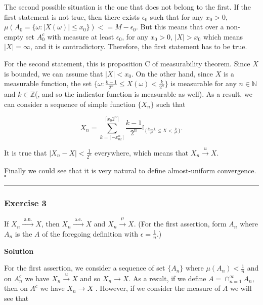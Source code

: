 \documentclass[
]{article}
\begin{document}
The second possible situation is the one that does not belong to the
first. If the first statement is not true, then there exists
\(\epsilon_0\) such that for any \(x_0 > 0\),
\(\mu(A_0 = \{\omega: |X(\omega)| \le x_0\}) <= M - \epsilon_0\). But
this means that over a non-empty set \(A_0^c\) with measure at least
\(\epsilon_0\), for any \(x_0 > 0\), \(|X| > x_0\) which means
\(|X| = \infty\), and it is contradictory. Therefore, the first
statement has to be true.

For the second statement, this is proposition
C\textquotesingle\textquotesingle{} of measurability theorem. Since
\(X\) is bounded, we can assume that \(|X| < x_0\). On the other hand,
since \(X\) is a measurable function, the set
\(\{\omega:  \frac{k-1}{2^n} \le X(\omega) < \frac{k}{2^n}\}\) is
measurable for any \(n\in \mathbb N\) and \(k \in \mathbb Z\)(, and so
the indicator function is measurable as well). As a result, we can
consider a sequence of simple function \(\{X_n\}\) such that

\[X_n = \sum_{k = \lceil -x_02^n\rceil }^{\lceil x_0 2^n \rceil } \frac{k-1}{2^n} \mathbb I_{\{\frac{k-1}{2^n} \le X < \frac{k}{2^n}\}}.\]

It is true that \(|X_n - X| < \frac{1}{2^n}\) everywhere, which means
that \(X_n \xrightarrow{u} X\).

Finally we could see that it is very natural to define almost-uniform
convergence. \(\square\)

\begin{center}\rule{0.5\linewidth}{0.5pt}\end{center}

\hypertarget{exercise-3-2}{%
  \subsubsection{Exercise 3}\label{exercise-3-2}}

If \(X_n \stackrel{\text { a.u. }}{\longrightarrow} X\), then
\(X_n \stackrel{\text { a.e. }}{\longrightarrow} X\) and
\(X_n \stackrel{\mu}{\longrightarrow} X\). (For the first assertion,
form \(A_n\) where \(A_n\) is the \(A\) of the foregoing definition with
\(\epsilon=\frac{1}{n}\).)

\textbf{Solution}

For the first assertion, we consider a sequence of set \(\{A_n\}\) where
\(\mu(A_n) < \frac{1}{n}\) and on \(A_n^c\) we have
\(X_n\xrightarrow{u} X\) and so \(X_n \to X\). As a result, if we define
\(A = \cap_{n=1}^\infty A_n\), then on \(A^c\) we have \(X_n\to X\) .
However, if we consider the measure of \(A\) we will see that
\end{document}
